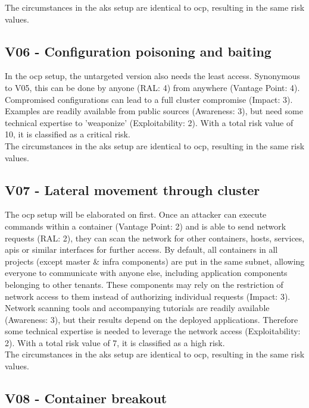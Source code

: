 The circumstances in the \gls{aks} setup are identical to \gls{ocp}, resulting in the same risk values.

\subsection{V06 - Configuration poisoning and baiting}

In the \gls{ocp} setup, the untargeted version also needs the least access. Synonymous to V05, this can be done by anyone (RAL: 4) from anywhere (Vantage Point: 4).
Compromised configurations can lead to a full cluster compromise (Impact: 3).
Examples are readily available from public sources (Awareness: 3), but need some technical expertise to 'weaponize' (Exploitability: 2).
With a total risk value of 10, it is classified as a critical risk. \\


The circumstances in the \gls{aks} setup are identical to \gls{ocp}, resulting in the same risk values.

\subsection{V07 - Lateral movement through cluster}

The \gls{ocp} setup will be elaborated on first. Once an attacker can execute commands within a container (Vantage Point: 2) and is able to send network requests (RAL: 2), they can scan the network for other containers, hosts, services, apis or similar interfaces for further access. By default, all containers in all projects (except master \& infra components) are put in the same subnet, allowing everyone to communicate with anyone else, including application components belonging to other tenants. These components may rely on the restriction of network access to them instead of authorizing individual requests (Impact: 3).
Network scanning tools and accompanying tutorials are readily available (Awareness: 3), but their results depend on the deployed applications. Therefore some technical expertise is needed to leverage the network access (Exploitability: 2). 
With a total risk value of 7, it is classified as a high risk. \\


The circumstances in the \gls{aks} setup are identical to \gls{ocp}, resulting in the same risk values.

\subsection{V08 - Container breakout}

